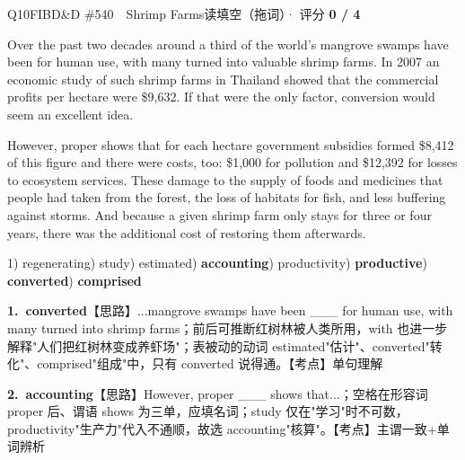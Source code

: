 \begin{qblock}{Q10\quad FIBD\&D \#540\ \ Shrimp Farms}{读填空（拖词）· 评分 \textcolor{cAccent}{\bfseries 0 / 4}}
\begin{promptbox}
Over the past two decades around a third of the world's mangrove swamps have been  for human use, with many turned into valuable shrimp farms. In 2007 an economic study of such shrimp farms in Thailand showed that the commercial profits per hectare were \$9,632. If that were the only factor, conversion would seem an excellent idea.

However, proper  shows that for each hectare government subsidies formed \$8,412 of this figure and there were costs, too: \$1,000 for pollution and \$12,392 for losses to ecosystem services. These  damage to the supply of foods and medicines that people had taken from the forest, the loss of habitats for fish, and less buffering against storms. And because a given shrimp farm only stays  for three or four years, there was the additional cost of restoring them afterwards.
\end{promptbox}
{\small 1) regenerating) study) estimated) \textbf{accounting}) productivity) \textbf{productive}) \textbf{converted}) \textbf{comprised}}
\begin{notebox}\footnotesize
\textbf{1.\ converted}\quad【思路】...mangrove swamps have been \_\_\_ for human use, with many turned into shrimp farms；前后可推断红树林被人类所用，with 也进一步解释"人们把红树林变成养虾场"；表被动的动词 estimated"估计"、converted"转化"、comprised"组成"中，只有 converted 说得通。【考点】单句理解\par\smallskip
\textbf{2.\ accounting}\quad【思路】However, proper \_\_\_ shows that...；空格在形容词 proper 后、谓语 shows 为三单，应填名词；study 仅在"学习"时不可数，productivity"生产力"代入不通顺，故选 accounting"核算"。【考点】主谓一致+单词辨析\par\smallskip

\end{notebox}
\end{qblock}
